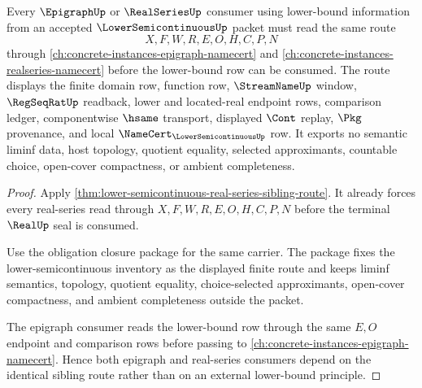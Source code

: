 \begin{theorem}
\label{thm:lowersemicontinuous-epigraph-dependency-route}
Every $\EpigraphUp$ or $\RealSeriesUp$ consumer using lower-bound information from an accepted $\LowerSemicontinuousUp$ packet must read the same route
$$
X,F,W,R,E,O,H,C,P,N
$$
through \autoref{ch:concrete-instances-epigraph-namecert} and \autoref{ch:concrete-instances-realseries-namecert} before the lower-bound row can be consumed. The route displays the finite domain row, function row, $\StreamNameUp$ window, $\RegSeqRatUp$ readback, lower and located-real endpoint rows, comparison ledger, componentwise $\hsame$ transport, displayed $\Cont$ replay, $\Pkg$ provenance, and local $\NameCert_{\LowerSemicontinuousUp}$ row. It exports no semantic liminf data, host topology, quotient equality, selected approximants, countable choice, open-cover compactness, or ambient completeness.
\end{theorem}
\begin{proof}
Apply \autoref{thm:lower-semicontinuous-real-series-sibling-route}. It already forces every real-series read through $X,F,W,R,E,O,H,C,P,N$ before the terminal $\RealUp$ seal is consumed.

Use the obligation closure package for the same carrier. The package fixes the lower-semicontinuous inventory as the displayed finite route and keeps liminf semantics, topology, quotient equality, choice-selected approximants, open-cover compactness, and ambient completeness outside the packet.

The epigraph consumer reads the lower-bound row through the same $E,O$ endpoint and comparison rows before passing to \autoref{ch:concrete-instances-epigraph-namecert}. Hence both epigraph and real-series consumers depend on the identical sibling route rather than on an external lower-bound principle.
\end{proof}
